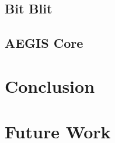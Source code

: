 \documentclass[a4paper]{article}
\begin{document}
	\subsection{Bit Blit}
	
	
	\subsection{AEGIS Core}
	
	
	
	\section{Conclusion}
	
	
	\section{Future Work}
	
	
	\printbibliography
	
	
\end{document}
